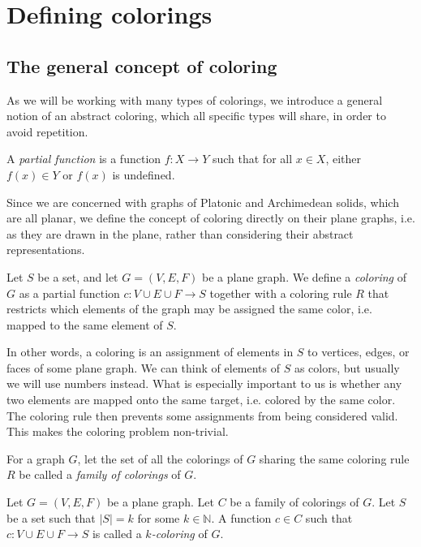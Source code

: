 \chapter{Defining colorings}

\section{The general concept of coloring}

As we will be working with many types of colorings, we introduce a general notion of an abstract coloring, which all specific types will share, in order to avoid repetition.

\begin{defn}
    A \emph{partial function} is a function $f : X \rightarrow Y$ such that for all $x \in X$, either $f(x) \in Y$ or $f(x)$ is undefined.
\end{defn}

Since we are concerned with graphs of Platonic and Archimedean solids, which are all planar, we define the concept of coloring directly on their plane graphs, i.e. as they are drawn in the plane, rather than considering their abstract representations.

\begin{defn}[coloring]
    Let $S$ be a set, and let $G = (V, E, F)$ be a plane graph. We define a \emph{coloring} of $G$ as a partial function $c : V \cup E \cup F \rightarrow S$ together with a coloring rule $R$ that restricts which elements of the graph may be assigned the same color, i.e. mapped to the same element of $S$.
\end{defn}

In other words, a coloring is an assignment of elements in $S$ to vertices, edges, or faces of some plane graph. We can think of elements of $S$ as colors, but usually we will use numbers instead. What is especially important to us is whether any two elements are mapped onto the same target, i.e. colored by the same color. The coloring rule then prevents some assignments from being considered valid. This makes the coloring problem non-trivial.

\begin{defn}
    For a graph $G$, let the set of all the colorings of $G$ sharing the same coloring rule $R$ be called a \emph{family of colorings} of $G$.
\end{defn}

\begin{defn}[$k$-coloring]
    Let $G = (V, E, F)$ be a plane graph. Let $C$ be a family of colorings of $G$. Let $S$ be a set such that $|S| = k$ for some $k \in \mathbb{N}$. A function $c \in C$ such that $c : V \cup E \cup F \rightarrow S$ is called a \emph{$k$-coloring} of $G$.
\end{defn}


